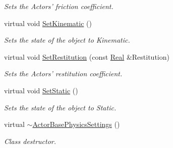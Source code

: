 \begin{DoxyCompactItemize}
\begin{DoxyCompactList}\small\item\em Sets the Actors' friction coefficient. \item\end{DoxyCompactList}\item 
virtual void \hyperlink{classphys_1_1ActorBasePhysicsSettings_a3e2a58dbbe32fd193f80821e8dd6e7f5}{SetKinematic} ()
\begin{DoxyCompactList}\small\item\em Sets the state of the object to Kinematic. \item\end{DoxyCompactList}\item 
virtual void \hyperlink{classphys_1_1ActorBasePhysicsSettings_ab379008b313aeeecfe82f641ce8b6305}{SetRestitution} (const \hyperlink{namespacephys_af7eb897198d265b8e868f45240230d5f}{Real} \&Restitution)
\begin{DoxyCompactList}\small\item\em Sets the Actors' restitution coefficient. \item\end{DoxyCompactList}\item 
virtual void \hyperlink{classphys_1_1ActorBasePhysicsSettings_a20addfbc6cdfdc7d6f7847a8695f1172}{SetStatic} ()
\begin{DoxyCompactList}\small\item\em Sets the state of the object to Static. \item\end{DoxyCompactList}\item 
\hypertarget{classphys_1_1ActorBasePhysicsSettings_a6e10308c8888c67a196982bc6cbdebbf}{
virtual \hyperlink{classphys_1_1ActorBasePhysicsSettings_a6e10308c8888c67a196982bc6cbdebbf}{$\sim$ActorBasePhysicsSettings} ()}
\label{classphys_1_1ActorBasePhysicsSettings_a6e10308c8888c67a196982bc6cbdebbf}

\begin{DoxyCompactList}\small\item\em Class destructor. \item\end{DoxyCompactList}\end{DoxyCompactItemize}

